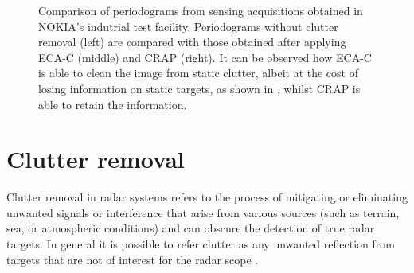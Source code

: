\begin{figure}[!t]
{	}\hfill
	\caption[]{\small Comparison of periodograms from sensing acquisitions obtained in NOKIA's indutrial test facility.
		Periodograms without clutter removal (left) are compared with those obtained after applying ECA-C (middle) and CRAP (right). It can be observed how ECA-C is able to clean the image from static clutter, albeit at the cost of losing information on static targets, as shown in , whilst CRAP is able to retain the information.  }
	\label{fig:Rad_clutter_crap-ecac}
\end{figure}
\section{Clutter removal}
\label{sec:clutter_removal}

	Clutter removal in radar systems refers to the process of mitigating or eliminating unwanted signals or interference that arise from various sources (such as terrain, sea, or atmospheric conditions) and can obscure the detection of true radar targets.
	In general it is possible to refer clutter as any unwanted reflection from targets that are not of interest for the radar scope \cite{Richards_Scheer_Holm_2010}.
	

